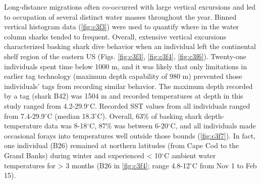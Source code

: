 Long-distance migrations often co-occurred with large vertical excursions and led to occupation of several distinct water masses throughout the year. Binned vertical histogram data (\cref{fig:c3f3}) were used to quantify where in the water column sharks tended to frequent. Overall, extensive vertical excursions characterized basking shark dive behavior when an individual left the continental shelf region of the eastern US (Figs. \ref{fig:c3f3}, \ref{fig:c3f4}, \ref{fig:c3f6}). Twenty-one individuals spent time below 1000 m, and it was likely that only limitations in earlier tag technology (maximum depth capability of 980 m) prevented those individuals' tags from recording similar behavior. The maximum depth recorded by a tag (shark B42) was 1504 m and recorded temperatures at depth in this study ranged from 4.2-29.9$^{\circ}$C. Recorded SST values from all individuals ranged from 7.4-29.9$^{\circ}$C (median 18.3$^{\circ}$C). Overall, 63\% of basking shark depth-temperature data was 8-18$^{\circ}$C, 87\% was between 6-20$^{\circ}$C, and all individuals made occasional forays into temperatures well outside those bounds (\cref{fig:c3f7}). In fact, one individual (B26) remained at northern latitudes (from Cape Cod to the Grand Banks) during winter and experienced < 10$^{\circ}$C ambient water temperatures for > 3 months (B26 in \cref{fig:c3f4}; range 4.8-12$^{\circ}$C from Nov 1 to Feb 15). 

